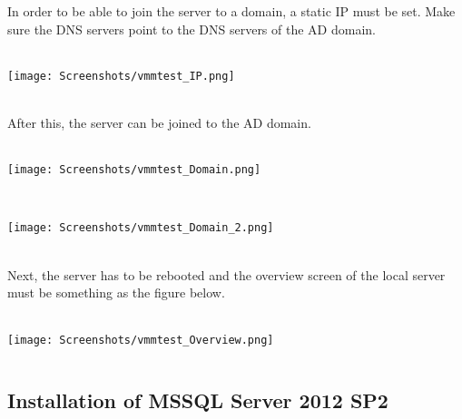In order to be able to join the server to a domain, a static IP must be set. Make sure the DNS servers point to the DNS servers of the AD domain.
$\;$ \\ \\
\noindent\begin{minipage}{\textwidth}
    \centering
    \texttt{[image: Screenshots/vmmtest\_IP.png]}
\end{minipage}
$\;$ \\ \\
After this, the server can be joined to the AD domain.
$\;$ \\ \\
\noindent\begin{minipage}{\textwidth}
    \centering
    \texttt{[image: Screenshots/vmmtest\_Domain.png]}
\end{minipage}
$\;$ \\ \\
\noindent\begin{minipage}{\textwidth}
    \centering
    \texttt{[image: Screenshots/vmmtest\_Domain\_2.png]}
\end{minipage}
$\;$ \\ \\
Next, the server has to be rebooted and the overview screen of the local server must be something as the figure below.
$\;$ \\ \\
\noindent\begin{minipage}{\textwidth}
    \centering
    \texttt{[image: Screenshots/vmmtest\_Overview.png]}
\end{minipage}
$\;$ \\ 

\subsection{Installation of MSSQL Server 2012 SP2}

